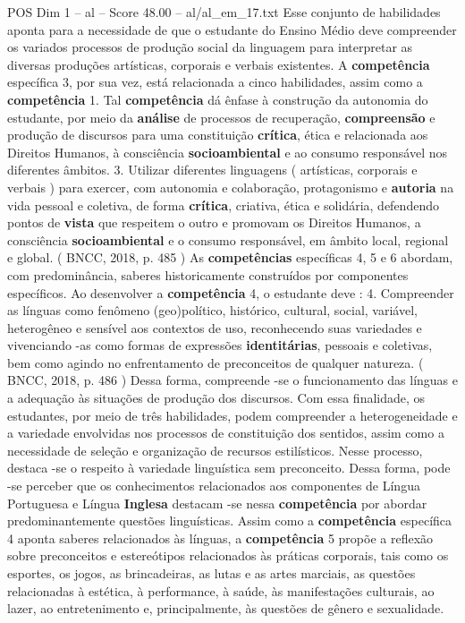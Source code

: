 \begin{textsample}{POS Dim 1 – al – Score 48.00 – al/al\_em\_17.txt}
Esse conjunto de habilidades aponta para a necessidade de que o estudante do Ensino Médio deve compreender os variados processos de produção social da linguagem para interpretar as diversas produções artísticas, corporais e verbais existentes.
A \textbf{competência} específica 3, por sua vez, está relacionada a cinco habilidades, assim como a \textbf{competência} 1.
Tal \textbf{competência} dá ênfase à construção da autonomia do estudante, por meio da \textbf{análise} de processos de recuperação, \textbf{compreensão} e produção de discursos para uma constituição \textbf{crítica}, ética e relacionada aos Direitos Humanos, à consciência \textbf{socioambiental} e ao consumo responsável nos diferentes âmbitos. 3.
Utilizar diferentes linguagens ( artísticas, corporais e verbais ) para exercer, com autonomia e colaboração, protagonismo e \textbf{autoria} na vida pessoal e coletiva, de forma \textbf{crítica}, criativa, ética e solidária, defendendo pontos de \textbf{vista} que respeitem o outro e promovam os Direitos Humanos, a consciência \textbf{socioambiental} e o consumo responsável, em âmbito local, regional e global. ( BNCC, 2018, p. 485 ) As \textbf{competências} específicas 4, 5 e 6 abordam, com predominância, saberes historicamente construídos por componentes específicos.
Ao desenvolver a \textbf{competência} 4, o estudante deve : 4.
Compreender as línguas como fenômeno (geo)político, histórico, cultural, social, variável, heterogêneo e sensível aos contextos de uso, reconhecendo suas variedades e vivenciando -as como formas de expressões \textbf{identitárias}, pessoais e coletivas, bem como agindo no enfrentamento de preconceitos de qualquer natureza. ( BNCC, 2018, p. 486 ) Dessa forma, compreende -se o funcionamento das línguas e a adequação às situações de produção dos discursos.
Com essa finalidade, os estudantes, por meio de três habilidades, podem compreender a heterogeneidade e a variedade envolvidas nos processos de constituição dos sentidos, assim como a necessidade de seleção e organização de recursos estilísticos.
Nesse processo, destaca -se o respeito à variedade linguística sem preconceito.
Dessa forma, pode -se perceber que os conhecimentos relacionados aos componentes de Língua Portuguesa e Língua \textbf{Inglesa} destacam -se nessa \textbf{competência} por abordar predominantemente questões linguísticas.
Assim como a \textbf{competência} específica 4 aponta saberes relacionados às línguas, a \textbf{competência} 5 propõe a reflexão sobre preconceitos e estereótipos relacionados às práticas corporais, tais como os esportes, os jogos, as brincadeiras, as lutas e as artes marciais, as questões relacionadas à estética, à performance, à saúde, às manifestações culturais, ao lazer, ao entretenimento e, principalmente, às questões de gênero e sexualidade.

\end{textsample}
